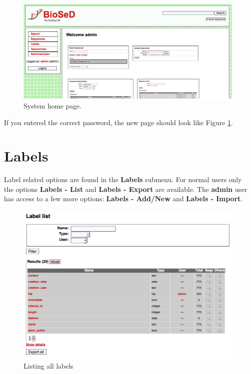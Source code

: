 \begin{figure}[H]
  \centering
    \includegraphics[scale=0.4]{interface.png}
  \caption{System home page.}
  \label{fig:home_page2}
\end{figure}

If you entered the correct password, the new page should look like Figure \ref{fig:home_page2}.

\section{Labels}

Label related options are found in the \textbf{Labels} submenu. For normal users
only the options \textbf{Labels - List} and \textbf{Labels - Export} are available.
The \textbf{admin} user has access to a few more options: \textbf{Labels - Add/New} and
\textbf{Labels - Import}.

\begin{figure}[H]
  \centering
    \includegraphics[scale=0.4]{label_list.png}
  \caption{Listing all labels}
  \label{fig:label_list}
\end{figure}

